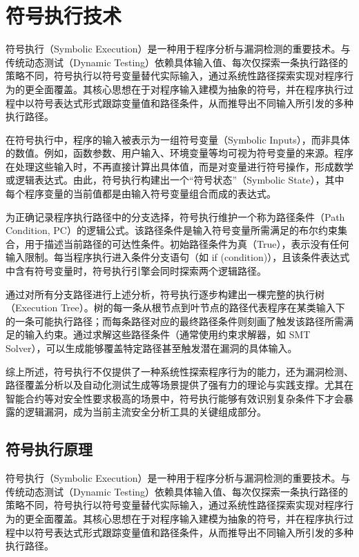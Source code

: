 \documentclass[print, master, vlined, timesmath]{DissertUESTC}
\begin{document}


\section{符号执行技术}

符号执行（Symbolic Execution）是一种用于程序分析与漏洞检测的重要技术\cite{}。与传统动态测试（Dynamic Testing）依赖具体输入值、每次仅探索一条执行路径的策略不同，符号执行以符号变量替代实际输入，通过系统性路径探索实现对程序行为的更全面覆盖。其核心思想在于对程序输入建模为抽象的符号，并在程序执行过程中以符号表达式形式跟踪变量值和路径条件，从而推导出不同输入所引发的多种执行路径。

在符号执行中，程序的输入被表示为一组符号变量（Symbolic Inputs），而非具体的数值。例如，函数参数、用户输入、环境变量等均可视为符号变量的来源。程序在处理这些输入时，不再直接计算出具体值，而是对变量进行符号操作，形成数学或逻辑表达式。由此，符号执行构建出一个“符号状态”（Symbolic State），其中每个程序变量的当前值都是由输入符号变量组合而成的表达式。

为正确记录程序执行路径中的分支选择，符号执行维护一个称为路径条件（Path Condition, PC）的逻辑公式\cite{}。该路径条件是输入符号变量所需满足的布尔约束集合，用于描述当前路径的可达性条件。初始路径条件为真（True），表示没有任何输入限制。每当程序执行进入条件分支语句（如 if (condition)），且该条件表达式中含有符号变量时，符号执行引擎会同时探索两个逻辑路径。

通过对所有分支路径进行上述分析，符号执行逐步构建出一棵完整的执行树（Execution Tree）\cite{}。树的每一条从根节点到叶节点的路径代表程序在某类输入下的一条可能执行路径；而每条路径对应的最终路径条件则刻画了触发该路径所需满足的输入约束。通过求解这些路径条件（通常使用约束求解器，如 SMT Solver），可以生成能够覆盖特定路径甚至触发潜在漏洞的具体输入。

综上所述，符号执行不仅提供了一种系统性探索程序行为的能力，还为漏洞检测、路径覆盖分析以及自动化测试生成等场景提供了强有力的理论与实践支撑。尤其在智能合约等对安全性要求极高的场景中，符号执行能够有效识别复杂条件下才会暴露的逻辑漏洞，成为当前主流安全分析工具的关键组成部分\cite{}。

\subsection{符号执行原理}
符号执行（Symbolic Execution）是一种用于程序分析与漏洞检测的重要技术\cite{}。与传统动态测试（Dynamic Testing）依赖具体输入值、每次仅探索一条执行路径的策略不同，符号执行以符号变量替代实际输入，通过系统性路径探索实现对程序行为的更全面覆盖。其核心思想在于对程序输入建模为抽象的符号，并在程序执行过程中以符号表达式形式跟踪变量值和路径条件，从而推导出不同输入所引发的多种执行路径。
\end{document}
